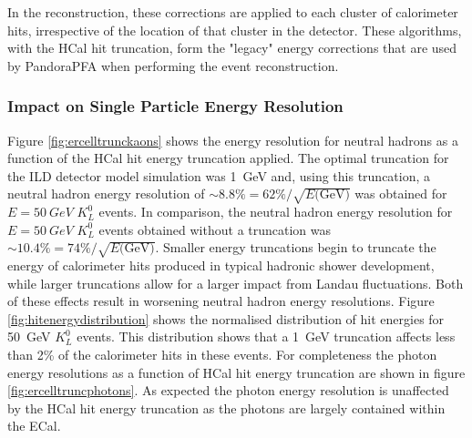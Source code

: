 In the reconstruction, these corrections are applied to each cluster of calorimeter hits, irrespective of the location of that cluster in the detector.  These algorithms, with the HCal hit truncation, form the "legacy" energy corrections that are used by PandoraPFA when performing the event reconstruction.    


\subsubsection{Impact on Single Particle Energy Resolution}
Figure \ref{fig:ercelltrunckaons} shows the energy resolution for neutral hadrons as a function of the HCal hit energy truncation applied.  The optimal truncation for the ILD detector model simulation was 1~GeV and, using this truncation, a neutral hadron energy resolution of $\sim 8.8\% = 62\% / \sqrt{E\text{(GeV)}}$ was obtained for $E = 50~GeV$ $K^{0}_{L}$ events.  In comparison, the neutral hadron energy resolution for $E = 50~GeV$ $K^{0}_{L}$ events obtained without a truncation was $\sim 10.4\% = 74\% / \sqrt{E\text{(GeV)}}$.  Smaller energy truncations begin to truncate the energy of calorimeter hits produced in typical hadronic shower development, while larger truncations allow for a larger impact from Landau fluctuations.  Both of these effects result in worsening neutral hadron energy resolutions.  {Figure \ref{fig:hitenergydistribution} shows the normalised distribution of hit energies for 50~GeV $K^{0}_{L}$ events.  This distribution shows that a 1~GeV truncation affects less than 2\% of the calorimeter hits in these events.}  For completeness the photon energy resolutions as a function of HCal hit energy truncation are shown in figure \ref{fig:ercelltruncphotons}.  As expected the photon energy resolution is unaffected by the HCal hit energy truncation as the photons are largely contained within the ECal.


